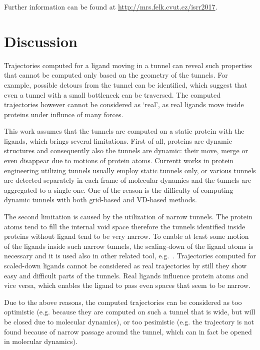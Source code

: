 \documentclass{svmult}
\begin{document}
Further information can be found at {\url{http://mrs.felk.cvut.cz/isrr2017}}.




\section{Discussion}

Trajectories computed for a ligand moving in a tunnel can reveal such properties that cannot be computed
only based on the geometry of the tunnels.
For example, possible detours from the tunnel can be identified, which suggest that even a tunnel with a small
bottleneck can be traversed.
The computed trajectories however cannot be considered as `real', as real ligands move inside proteins under influnce
of many forces.

This work assumes that the tunnels are computed on a static protein with the ligands, which brings several limitations.
First of all, proteins are dynamic structures and consequently also the tunnels are dynamic: their move, merge or even disappear due
to motions of protein atoms.
Currentt works in protein engineering utilizing tunnels usually employ static tunnels only, or 
various tunnels are detected separately in each frame of molecular dynamics and the tunnels are aggregated to a single one.
One of the reason is the difficulty of computing dynamic tunnels with both grid-based and VD-based methods.

The second limitation is caused by the utilization of narrow tunnels.
The protein atoms tend to fill the internal void space therefore the tunnels identified inside proteins without ligand tend
to be very narrow.
To enable at least some motion of the ligands inside such narrow tunnels, the scaling-down of the ligand atoms is necessary and it is used also in other related tool, e.g.~\cite{cortes2005path}.
Trajectories computed for scaled-down ligands cannot be considered as real trajectories by still they show easy and difficult parts of
the tunnels.
Real ligands influence protein atoms and vice versa, which enables the ligand to pass even spaces that seem to be narrow.

Due to the above reasons, the computed trajectories can be considered as too optimistic
(e.g. because they are computed on such a tunnel that is wide, but will be closed due to molecular dynamics),
or too pesimistic (e.g. the trajectory is not found because of narrow passage around the tunnel, which can in fact be
opened in molecular dynamics).
\end{document}
